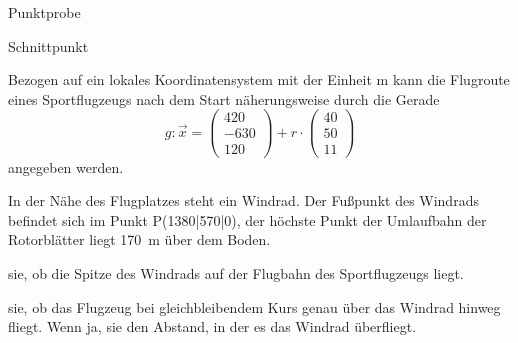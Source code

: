 \documentclass[11pt, a5paper, landscape]{scrartcl}
\begin{document}
	\hspace{1em}
	\clearpage
	
	\begin{center}
		\begin{multicols}{2}
			Punktprobe \\
			\columnbreak
			
			Schnittpunkt \\
		\end{multicols}
	\end{center}
	\clearpage
	
	\begin{aufgabe}
		Bezogen auf ein lokales Koordinatensystem mit der Einheit \si{\meter} kann die Flugroute eines Sportflugzeugs nach dem Start näherungsweise durch die Gerade
		\[ g: \vec{x} = \begin{pmatrix} 420 \\ -630 \\ 120 \end{pmatrix} + r\cdot \begin{pmatrix} 40 \\ 50 \\ 11 \end{pmatrix}\]
		angegeben werden.
		
		In der Nähe des Flugplatzes steht ein Windrad. Der Fußpunkt des Windrads befindet sich im Punkt P\pkt(1380|570|0), der höchste Punkt der Umlaufbahn der Rotorblätter liegt \SI{170}{\meter} über dem Boden.
		
		\begin{teilaufgaben}
			\teilaufgabe {} sie, ob die Spitze des Windrads auf der Flugbahn des Sportflugzeugs liegt.
		 
			\teilaufgabe {} sie, ob das Flugzeug bei gleichbleibendem Kurs genau über das Windrad hinweg fliegt. Wenn ja,  sie den Abstand, in der es das Windrad überfliegt.
		\end{teilaufgaben}
	\end{aufgabe}
	\clearpage
\end{document}
